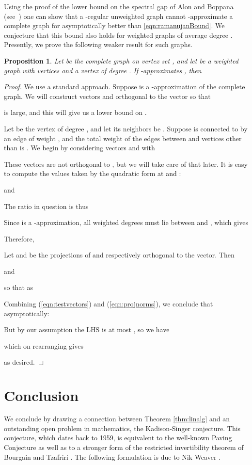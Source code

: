 \documentclass[12pt]{article}
\newtheorem{proposition}[theorem]{Proposition}
\begin{document}
Using the proof of the lower bound on the spectral gap
  of Alon and Boppana (see~\cite{Nilli}) one can show that a -regular
  unweighted graph cannot -approximate a complete graph for
   asymptotically better than \eqref{eqn:ramanujanBound}.
We conjecture that this bound also holds for weighted graphs of average degree .
Presently, we prove the following
  weaker result for such graphs.

\begin{proposition}\label{pro:lowerComplete}
Let  be the complete graph on vertex set ,
  and let  be a weighted graph with  vertices and
  a vertex of degree .
If  -approximates , then

\end{proposition}


\begin{proof}
We use a standard approach.
Suppose  is a -approximation of the complete graph. 
We will construct vectors  and  orthogonal to the  vector so
  that 
  
  is large, and this will give us a lower bound on .

Let  be the vertex of degree , and let
  its neighbors be . 
Suppose  is connected to  by an edge of weight , and the total weight
  of the edges between  and vertices other than  is
  .
We begin by considering vectors  and  with


These vectors are not orthogonal to , but we will take care of that
  later.
It is easy to compute the values taken by the quadratic form at  and :

and 

The ratio in question is thus

Since  is a -approximation, all weighted degrees must lie between 
and , which gives

Therefore,

Let  and  be the projections of  and  respectively orthogonal to
the  vector. Then 

and 

so that as  

Combining (\ref{eqn:testvectors}) and (\ref{eqn:projnorms}), we conclude that asymptotically:

But by our assumption the LHS is at most , so we have

which on rearranging gives

as desired.
\end{proof}
\section{Conclusion}
We conclude by drawing a connection between Theorem \ref{thm:linalg} and an
  outstanding open problem in mathematics, the Kadison-Singer conjecture. 
This conjecture, which dates back to 1959, is equivalent to the well-known
  Paving Conjecture \cite{ak-and, cass} as well as to a stronger form of the restricted invertibility
  theorem of Bourgain and Tzafriri \cite{btz,cass}.
The following formulation is due to Nik Weaver \cite{weaver}.
\end{document}

